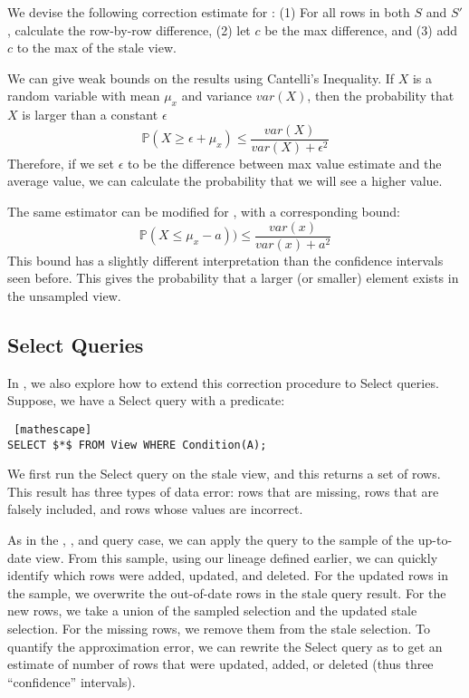 We devise the following correction estimate for \maxfunc: (1) For all rows in both $S$ and $S'$, calculate the row-by-row difference, (2) let $c$ be the max difference, and (3) add $c$ to the max of the stale view.

We can give weak bounds on the results using Cantelli's Inequality.
If $X$ is a random variable with mean $\mu_x$ and variance $var(X)$, then the probability that $X$ is larger than a constant $\epsilon$ 
\[
\mathbb{P}(X \ge \epsilon + \mu_x ) \le \frac{var(X)}{var(X) + \epsilon^2}
\]
Therefore, if we set $\epsilon$ to be the difference between max value estimate and the average value, we can calculate the probability that we will see a higher value. 

The same estimator can be modified for \minfunc, with a corresponding bound:
\[
\mathbb{P}(X \le \mu_x - a )) \le \frac{var(x)}{var(x) + a^2}
\]
This bound has a slightly different interpretation than the confidence intervals seen before.
This gives the probability that a larger (or smaller) element exists in the unsampled view.


\vspace{-.25em}
\subsection{Select Queries}
In \svc, we also explore how to extend this correction procedure to Select queries.
Suppose, we have a Select query with a predicate:
\begin{lstlisting} [mathescape]
SELECT $*$ FROM View WHERE Condition(A);
\end{lstlisting}

We first run the Select query on the stale view, and this returns a set of rows.
This result has three types of data error: rows that are missing, rows that are falsely included, and rows whose values are incorrect.

As in the \sumfunc, \countfunc, and \avgfunc query case, we can apply the query to the sample of the up-to-date view.
From this sample, using our lineage defined earlier, we can quickly identify which rows were added, updated, and deleted.
For the updated rows in the sample, we overwrite the out-of-date rows in the stale query result.
For the new rows, we take a union of the sampled selection and the updated stale selection.
For the missing rows, we remove them from the stale selection.
To quantify the approximation error, we can rewrite the Select query as \countfunc to get an estimate of number of rows that were updated, added, or deleted (thus three ``confidence'' intervals). 
\fi


